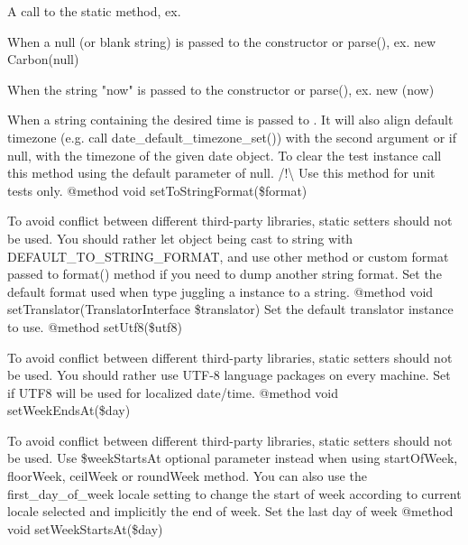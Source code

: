 \begin{DoxyRefList}
\begin{DoxyItemize}
\item A call to the static  method, ex. 
\item When a null (or blank string) is passed to the constructor or parse(), ex. new Carbon(null)
\item When the string "{}now"{} is passed to the constructor or parse(), ex. new (\textquotesingle{}now\textquotesingle{})
\item When a string containing the desired time is passed to . It will also align default timezone (e.\+g. call date\+\_\+default\+\_\+timezone\+\_\+set()) with the second argument or if null, with the timezone of the given date object. To clear the test instance call this method using the default parameter of null. /!\textbackslash{} Use this method for unit tests only. @method void set\+To\+String\+Format(\$format) 
\end{DoxyItemize}



To avoid conflict between different third-\/party libraries, static setters should not be used. You should rather let  object being cast to string with DEFAULT\+\_\+\+TO\+\_\+\+STRING\+\_\+\+FORMAT, and use other method or custom format passed to format() method if you need to dump another string format. Set the default format used when type juggling a  instance to a string. @method void set\+Translator(Translator\+Interface \$translator) Set the default translator instance to use. @method  set\+Utf8(\$utf8) 



To avoid conflict between different third-\/party libraries, static setters should not be used. You should rather use UTF-\/8 language packages on every machine. Set if UTF8 will be used for localized date/time. @method void set\+Week\+Ends\+At(\$day) 



To avoid conflict between different third-\/party libraries, static setters should not be used. Use \$week\+Starts\+At optional parameter instead when using start\+Of\+Week, floor\+Week, ceil\+Week or round\+Week method. You can also use the \textquotesingle{}first\+\_\+day\+\_\+of\+\_\+week\textquotesingle{} locale setting to change the start of week according to current locale selected and implicitly the end of week. Set the last day of week @method void set\+Week\+Starts\+At(\$day) 




\end{DoxyRefList}
